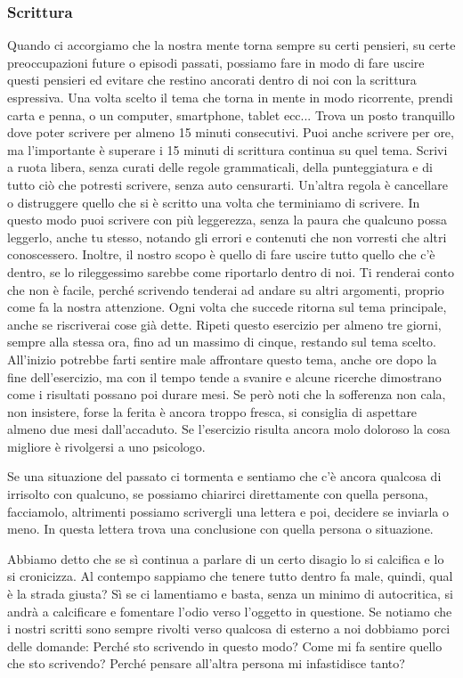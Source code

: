 \documentclass[12pt]{book} %
\begin{document}
\bigskip

\subsubsection{Scrittura}
Quando ci accorgiamo che la nostra mente torna sempre su certi pensieri, su certe preoccupazioni future o episodi
passati, possiamo fare in modo di fare uscire questi pensieri ed evitare che restino ancorati dentro di noi con la
scrittura espressiva. Una volta scelto il tema che torna in mente in modo ricorrente, prendi carta e penna, o un
computer, smartphone, tablet ecc... Trova un posto tranquillo dove poter scrivere per almeno 15 minuti consecutivi.
Puoi anche scrivere per ore, ma l'importante è superare i 15 minuti di scrittura continua su quel
tema. Scrivi a ruota libera, senza curati delle regole grammaticali, della punteggiatura e di tutto ciò che potresti
scrivere, senza auto censurarti. Un'altra regola è cancellare o distruggere quello che si è
scritto una volta che terminiamo di scrivere. In questo modo puoi scrivere con più leggerezza, senza la paura che
qualcuno possa leggerlo, anche tu stesso, notando gli errori e contenuti che non vorresti che altri conoscessero.
Inoltre, il nostro scopo è quello di fare uscire tutto quello che c'è dentro, se lo rileggessimo
sarebbe come riportarlo dentro di noi. Ti renderai conto che non è facile, perché scrivendo tenderai ad andare su altri
argomenti, proprio come fa la nostra attenzione. Ogni volta che succede ritorna sul tema principale, anche se
riscriverai cose già dette. Ripeti questo esercizio per almeno tre giorni, sempre alla stessa ora, fino ad un massimo
di cinque, restando sul tema scelto. All'inizio potrebbe farti sentire male affrontare questo
tema, anche ore dopo la fine dell'esercizio, ma con il tempo tende a svanire e alcune ricerche
dimostrano come i risultati possano poi durare mesi. Se però noti che la sofferenza non cala, non insistere, forse la
ferita è ancora troppo fresca, si consiglia di aspettare almeno due mesi dall'accaduto. Se
l'esercizio risulta ancora molo doloroso la cosa migliore è rivolgersi a uno psicologo. \ 

Se una situazione del passato ci tormenta e sentiamo che c'è ancora qualcosa di irrisolto con qualcuno, se possiamo
chiarirci direttamente con quella persona, facciamolo, altrimenti possiamo scrivergli una lettera e poi, decidere se
inviarla o meno. In questa lettera trova una conclusione con quella persona o situazione.

Abbiamo detto che se sì continua a parlare di un certo disagio lo si calcifica e lo si cronicizza. Al contempo sappiamo
che tenere tutto dentro fa male, quindi, qual è la strada giusta? Sì se ci lamentiamo e basta, senza un minimo di
autocritica, si andrà a calcificare e fomentare l'odio verso l'oggetto in questione. Se notiamo
che i nostri scritti sono sempre rivolti verso qualcosa di esterno a noi dobbiamo porci delle domande: Perché sto
scrivendo in questo modo? Come mi fa sentire quello che sto scrivendo? Perché pensare all'altra
persona mi infastidisce tanto?
\end{document}

